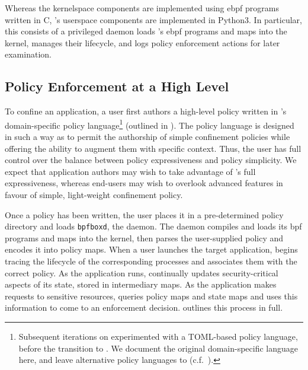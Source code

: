 Whereas the kernelspace components are implemented using \gls{ebpf} programs written in C,
\bpfbox{}'s userspace components are implemented in Python3. In particular, this consists
of a privileged daemon loads \bpfbox{}'s \gls{ebpf} programs and maps into the kernel,
manages their lifecycle, and logs policy enforcement actions for later examination.


\subsection{Policy Enforcement at a High Level}%
\label{ss:bpfbox-enforcement-overview}

To confine an application, a user first authors a high-level policy written in \bpfbox{}'s
domain-specific policy language\footnote{Subsequent iterations on \bpfbox{} experimented
with a TOML-based policy language, before the transition to \bpfcontain{}. We document the
original domain-specific language here, and leave alternative policy languages to
\bpfcontain{} (c.f.\ ).} (outlined in ). The
policy language is designed in such a way as to permit the authorship of simple
confinement policies while offering the ability to augment them with specific context.
Thus, the user has full control over the balance between policy expressiveness and policy
simplicity. We expect that application authors may wish to take advantage of \bpfbox{}'s
full expressiveness, whereas end-users may wish to overlook advanced features in favour of
simple, light-weight confinement policy.

Once a policy has been written, the user places it in a pre-determined policy directory
and loads \texttt{bpfboxd}, the \bpfbox{} daemon. The daemon compiles and loads its
\gls{bpf} programs and maps into the kernel, then parses the user-supplied policy and
encodes it into policy maps. When a user launches the target application, \bpfbox{} begins
tracing the lifecycle of the corresponding processes and associates them with the correct
policy. As the application runs, \bpfbox{} continually updates security-critical aspects
of its state, stored in intermediary maps. As the application makes requests to sensitive
resources, \bpfbox{} queries policy maps and state maps and uses this information to come
to an enforcement decision.  outlines this process in full.

